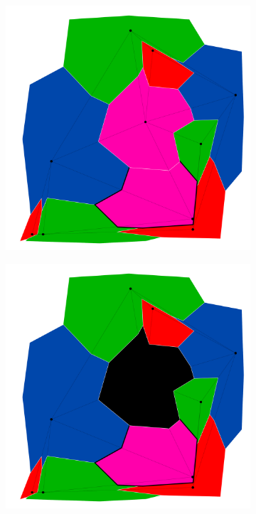 \documentclass{article}
\begin{document}
\begin{figure}[h!]
\begin{subfigure}{0.18\textwidth}
				\caption{}
				\label{high_f2}
			\end{subfigure}
			\;
			\begin{subfigure}{0.18\textwidth}
				\centering
				\includegraphics[width=\textwidth]{images/sequences/forward_backtracking/bt_forward_I00017}
				\caption{}
				\label{high_f3}
			\end{subfigure}
			\;
			\begin{subfigure}{0.18\textwidth}
				\centering
				\includegraphics[width=\textwidth]{images/sequences/forward_backtracking/bt_forward_I00018}

\end{subfigure}
\end{figure}
\end{document}
